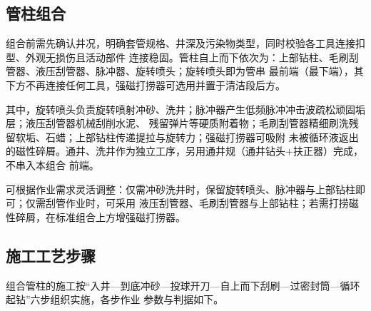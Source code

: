 \subsection{管柱组合}

组合前需先确认井况，明确套管规格、井深及污染物类型，同时校验各工具连接扣型、外观无损伤且活动部件
连接稳固。管柱自上而下依次为：上部钻柱、毛刷刮管器、液压刮管器、脉冲器、旋转喷头；旋转喷头即为管串
最前端（最下端），其下方不再连接任何工具，强磁打捞器可选用并置于清洁段后方。

其中，旋转喷头负责旋转喷射冲砂、洗井；脉冲器产生低频脉冲冲击波疏松顽固垢层；液压刮管器机械刮削水泥、
残留弹片等硬质附着物；毛刷刮管器精细刷洗残留软垢、石蜡；上部钻柱传递提拉与旋转力；强磁打捞器可吸附
未被循环液返出的磁性碎屑。通井、洗井作为独立工序，另用通井规（通井钻头$+$扶正器）完成，不串入本组合
前端。

可根据作业需求灵活调整：仅需冲砂洗井时，保留旋转喷头、脉冲器与上部钻柱即可；仅需刮管作业时，可采用
液压刮管器、毛刷刮管器与上部钻柱；若需打捞磁性碎屑，在标准组合上方增强磁打捞器。

\subsection{施工工艺步骤}

组合管柱的施工按“入井—到底冲砂—投球开刀—自上而下刮刷—过密封筒—循环起钻”六步组织实施，各步作业
参数与判据如下。

